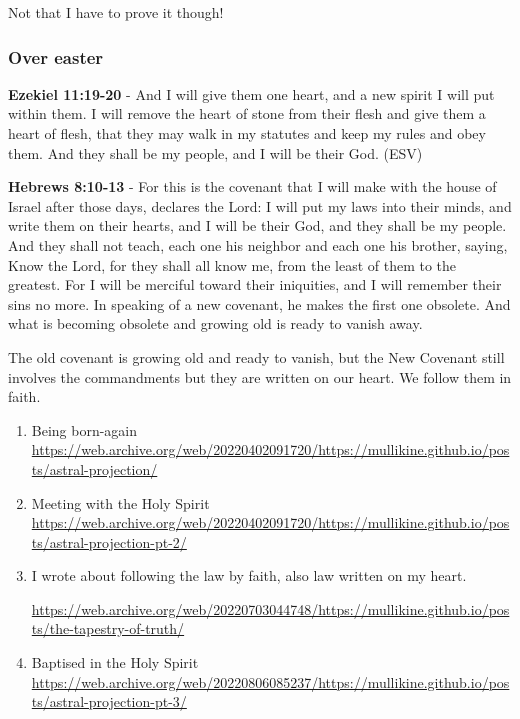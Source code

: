 \documentclass[11pt]{article}
\begin{document}
Not that I have to prove it though!

\subsubsection{Over easter}
\label{sec:orgefb0077}
\textbf{Ezekiel 11:19-20} - And I will give them one heart, and a new spirit I will put within them. I will remove the heart of stone from their flesh and give them a heart of flesh, that they may walk in my statutes and keep my rules and obey them. And they shall be my people, and I will be their God. (ESV)

\textbf{Hebrews 8:10-13} - For this is the covenant that I will make with the house of Israel after those days, declares the Lord: I will put my laws into their minds, and write them on their hearts, and I will be their God, and they shall be my people.  And they shall not teach, each one his neighbor and each one his brother, saying, Know the Lord, for they shall all know me, from the least of them to the greatest.  For I will be merciful toward their iniquities, and I will remember their sins no more.  In speaking of a new covenant, he makes the first one obsolete. And what is becoming obsolete and growing old is ready to vanish away.

The old covenant is growing old and ready to vanish, but the New Covenant still involves the commandments but they are written on our heart.
We follow them in faith.

\begin{enumerate}
\item Being born-again
\label{sec:org7425808}
\url{https://web.archive.org/web/20220402091720/https://mullikine.github.io/posts/astral-projection/}

\item Meeting with the Holy Spirit
\label{sec:org0494d7a}
\url{https://web.archive.org/web/20220402091720/https://mullikine.github.io/posts/astral-projection-pt-2/}

\item I wrote about following the law by faith, also law written on my heart.
\label{sec:orgca70dfd}

\url{https://web.archive.org/web/20220703044748/https://mullikine.github.io/posts/the-tapestry-of-truth/}

\item Baptised in the Holy Spirit
\label{sec:org1df56d9}
\url{https://web.archive.org/web/20220806085237/https://mullikine.github.io/posts/astral-projection-pt-3/}
\end{enumerate}
\end{document}
